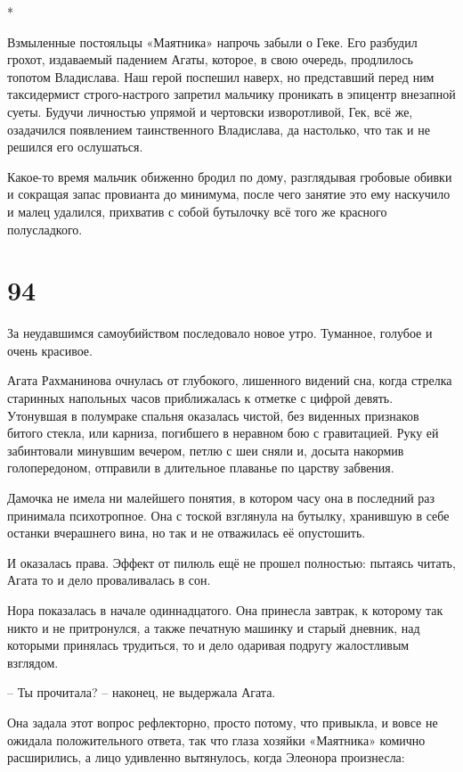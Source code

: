 \documentclass[
  a5paperpaper,
  DIV=11,
  numbers=noendperiod]{scrreprt}
\begin{document}
*

Взмыленные постояльцы «Маятника» напрочь забыли о Геке. Его разбудил
грохот, издаваемый падением Агаты, которое, в свою очередь, продлилось
топотом Владислава. Наш герой поспешил наверх, но представший перед ним
таксидермист строго-настрого запретил мальчику проникать в эпицентр
внезапной суеты. Будучи личностью упрямой и чертовски изворотливой, Гек,
всё же, озадачился появлением таинственного Владислава, да настолько,
что так и не решился его ослушаться.

Какое-то время мальчик обиженно бродил по дому, разглядывая гробовые
обивки и сокращая запас провианта до минимума, после чего занятие это
ему наскучило и малец удалился, прихватив с собой бутылочку всё того же
красного полусладкого.

\section*{94}\label{94}


За неудавшимся самоубийством последовало новое утро. Туманное, голубое и
очень красивое.

Агата Рахманинова очнулась от глубокого, лишенного видений сна, когда
стрелка старинных напольных часов приближалась к отметке с цифрой
девять. Утонувшая в полумраке спальня оказалась чистой, без виденных
признаков битого стекла, или карниза, погибшего в неравном бою с
гравитацией. Руку ей забинтовали минувшим вечером, петлю с шеи сняли и,
досыта накормив голопередоном, отправили в длительное плаванье по
царству забвения.

Дамочка не имела ни малейшего понятия, в котором часу она в последний
раз принимала психотропное. Она с тоской взглянула на бутылку, хранившую
в себе останки вчерашнего вина, но так и не отважилась её опустошить.

И оказалась права. Эффект от пилюль ещё не прошел полностью: пытаясь
читать, Агата то и дело проваливалась в сон.

Нора показалась в начале одиннадцатого. Она принесла завтрак, к которому
так никто и не притронулся, а также печатную машинку и старый дневник,
над которыми принялась трудиться, то и дело одаривая подругу жалостливым
взглядом.

-- Ты прочитала? -- наконец, не выдержала Агата.

Она задала этот вопрос рефлекторно, просто потому, что привыкла, и вовсе
не ожидала положительного ответа, так что глаза хозяйки «Маятника»
комично расширились, а лицо удивленно вытянулось, когда Элеонора
произнесла:
\end{document}
